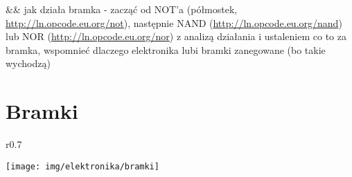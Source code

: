 \documentclass{pdfBooklets}
\begin{document}
\begin{teacherOnly}
\begin{easylist}[itemize]
		&& jak działa bramka - zacząć od NOT'a (półmostek, \url{http://ln.opcode.eu.org/not}), następnie NAND (\url{http://ln.opcode.eu.org/nand}) lub NOR (\url{http://ln.opcode.eu.org/nor}) z analizą działania i ustaleniem co to za bramka, wspomnieć dlaczego elektronika lubi bramki zanegowane (bo takie wychodzą)
	\end{easylist}
\end{teacherOnly}

\section{Bramki}
\begin{wrapfigure}{r}{0.7\textwidth}
  \begin{center}
    \vspace{-40pt}
    \texttt{[image: img/elektronika/bramki]}
    \vspace{-20pt}
  \end{center}
\end{wrapfigure}
\end{document}

